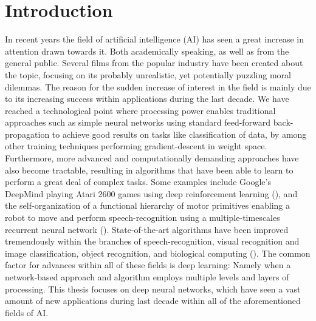 
\chapter{Introduction}

In recent years the field of artificial intelligence (AI) has seen a great increase in attention drawn towards it. Both academically speaking, as well as from the general public. Several films from the popular industry have been created about the topic, focusing on its probably unrealistic, yet potentially puzzling moral dilemmas. The reason for the sudden increase of interest in the field is mainly due to its increasing success within applications during the last decade. We have reached a technological point where processing power enables traditional approaches such as simple neural networks using standard feed-forward back-propagation to achieve good results on tasks like classification of data, by among other training techniques performing gradient-descent in weight space. Furthermore, more advanced and computationally demanding approaches have also become tractable, resulting in algorithms that have been able to learn to perform a great deal of complex tasks. Some examples include Google's DeepMind playing Atari 2600 games using deep reinforcement learning (\cite{Mnih2015}), and the self-organization of a functional hierarchy of motor primitives enabling a robot to move and perform speech-recognition using a multiple-timescales recurrent neural network (\cite{Tani2014}). State-of-the-art algorithms have been improved tremendously within the branches of speech-recognition, visual recognition and image classification, object recognition, and biological computing (\cite{LeCun2015}). The common factor for advances within all of these fields is deep learning: Namely when a network-based approach and algorithm employs multiple levels and layers of processing. This thesis focuses on deep neural networks, which have seen a vast amount of new applications during last decade within all of the aforementioned fields of AI.
\\

